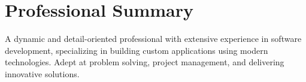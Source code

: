 \section*{Professional Summary}
A dynamic and detail-oriented professional with extensive experience in software development, specializing in building custom applications using modern technologies. Adept at problem solving, project management, and delivering innovative solutions.

